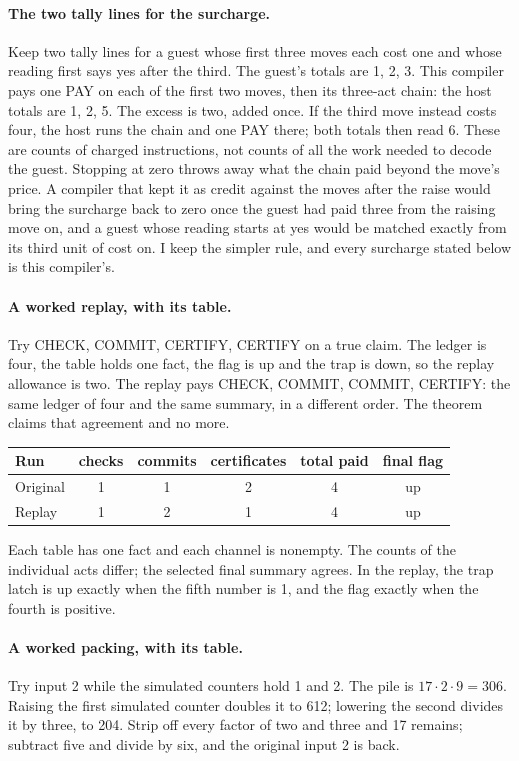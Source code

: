 \documentclass[11pt,twoside]{article}
\theoremstyle{thielethm}
\theoremstyle{thieledef}
\theoremstyle{thieledef}
\theoremstyle{thieledef}
\theoremstyle{thielethm}
\theoremstyle{thieleobs}
\theoremstyle{thielethm}
\begin{document}
\paragraph{The two tally lines for the surcharge.}
Keep two tally lines for a guest whose first three moves each cost one and whose
reading first says yes after the third. The guest's totals are 1, 2, 3. This
compiler pays one PAY on each of the first two moves, then its three-act chain:
the host totals are 1, 2, 5. The excess is two, added once. If the third move
instead costs four, the host runs the chain and one PAY there; both totals then
read 6. These are counts of charged instructions, not counts of all the work needed to decode the guest. Stopping at zero throws away what the chain paid beyond the move's price. A compiler that kept it as credit against the moves after the raise would bring the surcharge back to zero once the guest had paid three from the raising move on, and a guest whose reading starts at yes would be matched exactly from its third unit of cost on. I keep the simpler rule, and every surcharge stated below is this compiler's.


\paragraph{A worked replay, with its table.}
Try CHECK, COMMIT, CERTIFY, CERTIFY on a true claim. The ledger is four, the table holds one
fact, the flag is up and the trap is down, so the replay allowance is two. The replay pays
CHECK, COMMIT, COMMIT, CERTIFY: the same ledger of four and the same summary, in a different order.
The theorem claims that agreement and no more.

\begin{center}
\small
\begin{tabular}{@{}lccccc@{}}
Run & checks & commits & certificates & total paid & final flag \\ \hline
Original & 1 & 1 & 2 & 4 & up \\
Replay & 1 & 2 & 1 & 4 & up \\ \hline
\end{tabular}
\end{center}

Each table has one fact and each channel is nonempty. The counts of the
individual acts differ; the selected final summary agrees. In the replay, the trap latch is up exactly when the fifth number is 1, and the flag
exactly when the fourth is positive.

\paragraph{A worked packing, with its table.}
Try input 2 while the simulated counters hold 1 and 2. The pile is
$17\cdot2\cdot9=306$. Raising the first simulated counter doubles it to 612; lowering
the second divides it by three, to 204. Strip off every factor of two and three and 17
remains; subtract five and divide by six, and the original input 2 is back.
\end{document}
